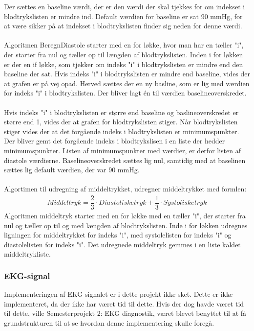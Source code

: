 Der sættes en baseline værdi, der er den værdi der skal tjekkes for om indekset i blodtrykslisten er mindre ind. Default værdien for baseline er sat 90 mmHg, for at være sikker på at indekset i blodtrykslisten finder sig neden for denne værdi.\\\\
 Algoritmen BeregnDiastole starter med en for løkke, hvor man har en tæller "i", der starter fra nul og tæller op til længden af blodtrykslisten. Inden i for løkken er der en if løkke, som tjekker om indeks "i" i blodtrykslisten er mindre end den baseline der sat. Hvis indeks "i" i blodtrykslisten er mindre end baseline, vides der at grafen er på vej opad. Herved sættes der en ny basline, som er lig med værdien for indeks "i" i blodtrykslisten.  Der bliver lagt én til værdien baselineoverskredet. \\\\
Hvis indeks "i" i blodtrykslisten er større end baseline og baslineoverskredet er større end 1, vides der at grafen for blodtrykslisten stiger. Når blodtrykslisten stiger vides der at det forgående indeks i blodtrykslisten er minimumspunkter. Der bliver gemt det forgående indeks i blodtrykslisen i en liste der hedder minimumspunkter. Listen af minimumspunkter med værdier, er derfor listen af diastole værdierne. Baselineoverskredet sættes lig nul, samtidig med at baselinen sættes lig default værdien, der var 90 mmHg.\\\\
Algortimen til udregning af middeltrykket, udregner middeltrykket med \cite{blodtrykwiki} formlen:
\begin{align}
Middeltryk = \dfrac{2}{3}\cdot Diastoliske tryk + \dfrac{1}{3} \cdot Systoliske tryk
\end{align}
Algoritmen middeltryk starter med en for løkke med en tæller "i", der starter fra nul og tæller op til og med længden af blodtrykslisten. Inde i for løkken udregnes ligningen for middeltrykket for indeks "i", med systolelisten for indeks "i" og diastolelisten for indeks "i". Det udregnede middeltryk gemmes i en liste kaldet middeltrykliste. 
\subsubsection{EKG-signal}
Implementeringen af EKG-signalet er i dette projekt ikke sket. Dette er ikke implementeret, da der ikke har været tid til dette. Hvis der dog havde været tid til dette, ville Semesterprojekt 2: EKG diagnostik, været blevet benyttet til at få grundstrukturen til at se hvordan denne implementering skulle foregå.
